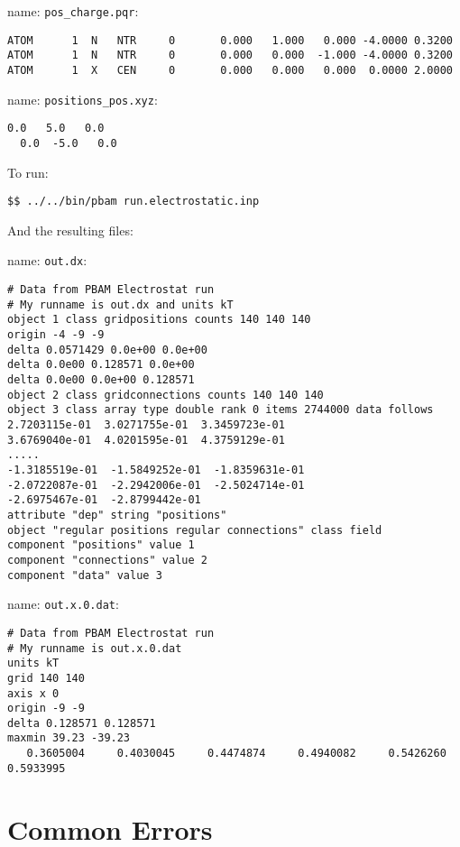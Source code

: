 name:  \texttt{pos\_charge.pqr}:
\begin{lstlisting}[style = MyBash]
ATOM      1  N   NTR     0       0.000   1.000   0.000 -4.0000 0.3200
ATOM      1  N   NTR     0       0.000   0.000  -1.000 -4.0000 0.3200
ATOM      1  X   CEN     0       0.000   0.000   0.000  0.0000 2.0000
\end{lstlisting}

\medskip

name:  \texttt{positions\_pos.xyz}:
\begin{lstlisting}[style = MyBash]
  0.0   5.0   0.0
  0.0  -5.0   0.0
\end{lstlisting}
\medskip

To run: 
\begin{lstlisting}[style = MyBash]
$$ ../../bin/pbam run.electrostatic.inp
\end{lstlisting}
\medskip

And the resulting files: 

name: \texttt{out.dx}:
\begin{lstlisting}[style = MyBash]
# Data from PBAM Electrostat run
# My runname is out.dx and units kT
object 1 class gridpositions counts 140 140 140
origin -4 -9 -9
delta 0.0571429 0.0e+00 0.0e+00
delta 0.0e00 0.128571 0.0e+00
delta 0.0e00 0.0e+00 0.128571
object 2 class gridconnections counts 140 140 140
object 3 class array type double rank 0 items 2744000 data follows
2.7203115e-01  3.0271755e-01  3.3459723e-01  
3.6769040e-01  4.0201595e-01  4.3759129e-01 
.....
-1.3185519e-01  -1.5849252e-01  -1.8359631e-01
-2.0722087e-01  -2.2942006e-01  -2.5024714e-01
-2.6975467e-01  -2.8799442e-01
attribute "dep" string "positions"
object "regular positions regular connections" class field
component "positions" value 1
component "connections" value 2
component "data" value 3
\end{lstlisting}
\medskip

name: \texttt{out.x.0.dat}:
\begin{lstlisting}[style = MyBash]
# Data from PBAM Electrostat run
# My runname is out.x.0.dat
units kT
grid 140 140 
axis x 0 
origin -9 -9
delta 0.128571 0.128571
maxmin 39.23 -39.23
   0.3605004     0.4030045     0.4474874     0.4940082     0.5426260     0.5933995
\end{lstlisting}


\chapter{Common Errors}

